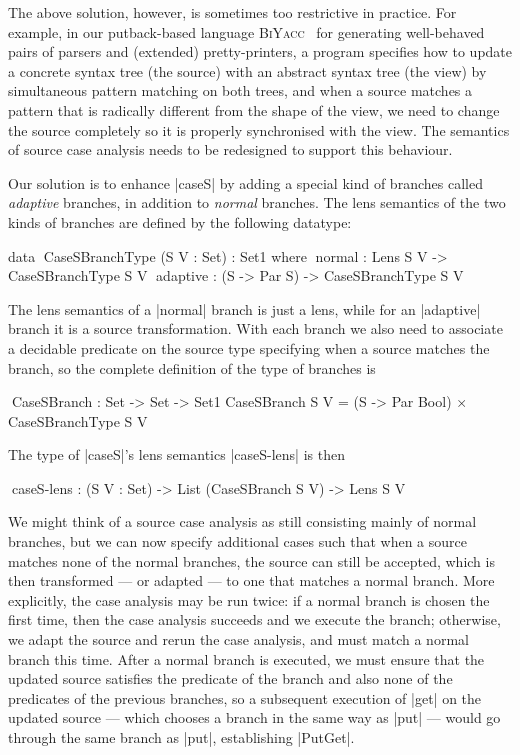 \documentclass[fleqn]{llncs}
\renewcommand{\emph}{\textsl}
\newcommand{\BiYacc}{\textsc{BiYacc}}
\begin{document}
The above solution, however, is sometimes too restrictive in practice.
For example, in our putback-based language \BiYacc~\cite{Zhu-BiYacc} for generating well-behaved pairs of parsers and (extended) pretty-printers, a program specifies how to update a concrete syntax tree (the source) with an abstract syntax tree (the view) by simultaneous pattern matching on both trees, and when a source matches a pattern that is radically different from the shape of the view, we need to change the source completely so it is properly synchronised with the view.
The semantics of source case analysis needs to be redesigned to support this behaviour.

Our solution is to enhance |caseS| by adding a special kind of branches called \emph{adaptive} branches, in addition to \emph{normal} branches.
The lens semantics of the two kinds of branches are defined by the following datatype:
\begin{code}
data ^^^CaseSBranchType (S V : Set) : Set1 where
  ^^^normal    : Lens S V      -> CaseSBranchType S V
  ^^^adaptive  : (S -> Par S)  -> CaseSBranchType S V
\end{code}
The lens semantics of a |normal| branch is just a lens, while for an |adaptive| branch it is a source transformation.
With each branch we also need to associate a decidable predicate on the source type specifying when a source matches the branch, so the complete definition of the type of branches is
\begin{code}
^^^CaseSBranch : Set -> Set -> Set1
CaseSBranch S V = (S -> Par Bool) × CaseSBranchType S V
\end{code}
The type of |caseS|'s lens semantics |caseS-lens| is then
\begin{code}
^^^caseS-lens : (S V : Set) -> List (CaseSBranch S V) -> Lens S V
\end{code}
We might think of a source case analysis as still consisting mainly of normal branches, but we can now specify additional cases such that when a source matches none of the normal branches, the source can still be accepted, which is then transformed --- or adapted --- to one that matches a normal branch.
More explicitly, the case analysis may be run twice: if a normal branch is chosen the first time, then the case analysis succeeds and we execute the branch; otherwise, we adapt the source and rerun the case analysis, and must match a normal branch this time.
After a normal branch is executed, we must ensure that the updated source satisfies the predicate of the branch and also none of the predicates of the previous branches, so a subsequent execution of |get| on the updated source --- which chooses a branch in the same way as |put| --- would go through the same branch as |put|, establishing |PutGet|.
\end{document}
